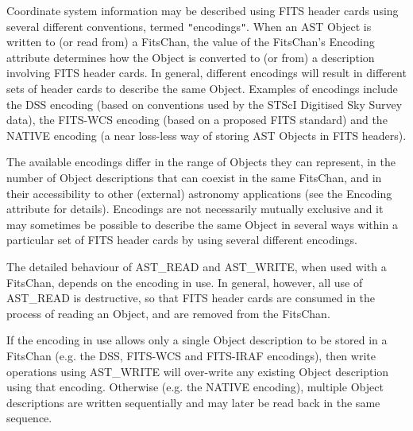 \documentclass[twoside,11pt]{article}
\newcommand{\htmlref}[2]{#1}
\begin{document}
{{      Coordinate system information may be described using FITS header
      cards using several different conventions, termed
      {\tt{"}}encodings{\tt{"}}. When an AST Object is written to (or read from) a
      FitsChan, the value of the FitsChan's \htmlref{Encoding}{Encoding} attribute
      determines how the Object is converted to (or from) a
      description involving FITS header cards. In general, different
      encodings will result in different sets of header cards to
      describe the same Object. Examples of encodings include the DSS
      encoding (based on conventions used by the STScI Digitised Sky
      Survey data), the FITS-WCS encoding (based on a proposed FITS
      standard) and the NATIVE encoding (a near loss-less way of
      storing AST Objects in FITS headers).

      The available encodings differ in the range of Objects they can
      represent, in the number of Object descriptions that can coexist
      in the same FitsChan, and in their accessibility to other
      (external) astronomy applications (see the Encoding attribute
      for details). Encodings are not necessarily mutually exclusive
      and it may sometimes be possible to describe the same Object in
      several ways within a particular set of FITS header cards by
      using several different encodings.

      The detailed behaviour of AST\_READ and AST\_WRITE, when used with
      a FitsChan, depends on the encoding in use. In general, however,
      all use of AST\_READ is destructive, so that FITS header cards
      are consumed in the process of reading an Object, and are
      removed from the FitsChan.

      If the encoding in use allows only a single Object description
      to be stored in a FitsChan (e.g. the DSS, FITS-WCS and FITS-IRAF
      encodings), then write operations using AST\_WRITE will
      over-write any existing Object description using that
      encoding. Otherwise (e.g. the NATIVE encoding), multiple Object
      descriptions are written sequentially and may later be read
      back in the same sequence.
   }
   }
\end{document}
